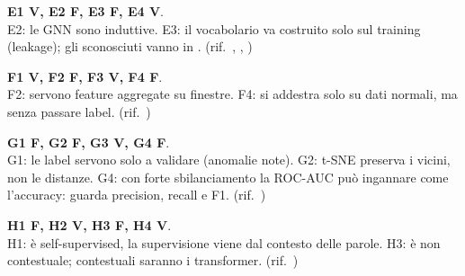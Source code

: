 \begin{soluzione}
\textbf{E1 V, E2 F, E3 F, E4 V}.\\
E2: le GNN sono induttive. E3: il vocabolario va costruito solo sul training (leakage); gli sconosciuti vanno in . (rif.\ , , )
\end{soluzione}

\begin{soluzione}
\textbf{F1 V, F2 F, F3 V, F4 F}.\\
F2: servono feature aggregate su finestre. F4: si addestra solo su dati normali, ma senza passare label. (rif.\ )
\end{soluzione}

\begin{soluzione}
\textbf{G1 F, G2 F, G3 V, G4 F}.\\
G1: le label servono solo a validare (anomalie note). G2: t-SNE preserva i vicini, non le distanze. G4: con forte sbilanciamento la ROC-AUC può ingannare come l'accuracy: guarda precision, recall e F1. (rif.\ )
\end{soluzione}

\begin{soluzione}
\textbf{H1 F, H2 V, H3 F, H4 V}.\\
H1: è self-supervised, la supervisione viene dal contesto delle parole. H3: è non contestuale; contestuali saranno i transformer. (rif.\ )
\end{soluzione}
